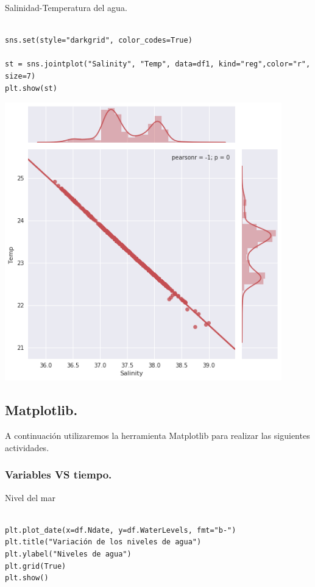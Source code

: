 \documentclass{article} %
\begin{document}
Salinidad-Temperatura del agua. 

\begin{verbatim} 

sns.set(style="darkgrid", color_codes=True)

st = sns.jointplot("Salinity", "Temp", data=df1, kind="reg",color="r", size=7)
plt.show(st)

\end{verbatim}

 \begin{center}
 	\includegraphics[width=12cm]{st.png}
 \end{center}
 

\subsection{Matplotlib.}

A continuación utilizaremos la herramienta Matplotlib para realizar las siguientes actividades. 

\subsubsection{Variables VS tiempo.}

\hspace{0.45 cm}Nivel del mar

\begin{verbatim} 

plt.plot_date(x=df.Ndate, y=df.WaterLevels, fmt="b-")
plt.title("Variación de los niveles de agua")
plt.ylabel("Niveles de agua")
plt.grid(True)
plt.show()

\end{verbatim}
\end{document}
